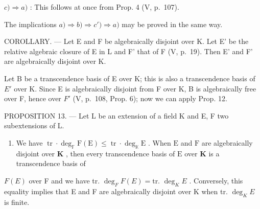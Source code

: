 \(c) \Rightarrow a)\) : This follows at once from Prop. 4 (V, p.~107).

The implications \(a) \Rightarrow b) \Rightarrow c') \Rightarrow a)\) may be proved in the same way.

COROLLARY. --- Let E and F be algebraically disjoint over K. Let E' be the relative algebraic closure of E in L and F' that of F (V, p.~19). Then E' and F' are algebraically disjoint over K.

Let B be a transcendence basis of E over K; this is also a transcendence basis of \(E'\) over K. Since E is algebraically disjoint from F over K, B is algebraically free over F, hence over \(F'\) (V, p.~108, Prop. 6); now we can apply Prop. 12.

PROPOSITION 13. --- Let L be an extension of a field K and E, F two subextensions of L.

\begin{enumerate}
\def\labelenumi{\alph{enumi})}
\tightlist
\item
  We have \(\operatorname{tr} \cdot \deg_{\mathbb{F}} \mathrm{F}(\mathrm{E}) \leqslant \operatorname{tr} \cdot \deg_{\mathbb{K}} \mathrm{E}\) . When \(\mathrm{E}\) and \(\mathrm{F}\) are algebraically disjoint over \(\mathbf{K}\) , then every transcendence basis of \(\mathrm{E}\) over \(\mathbf{K}\) is a transcendence basis of
\end{enumerate}

\(F(E)\) over F and we have tr. \(\deg_{F}F(E) = \text{tr. } \deg_{K}E\) . Conversely, this equality implies that E and F are algebraically disjoint over K when tr. \(\deg_{K}E\) is finite.

